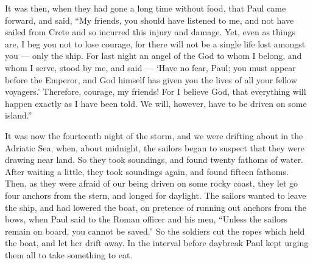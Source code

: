  It was then, when they had gone a long time without food,
that Paul came forward, and said, ``My friends, you should have listened
to me, and not have sailed from Crete and so incurred this injury and
damage.  Yet, even as things are, I beg you not to lose
courage, for there will not be a single life lost amongst you --- only
the ship.  For last night an angel of the God to whom I
belong, and whom I serve, stood by me, and said ---  `Have
no fear, Paul; you must appear before the Emperor, and God himself has
given you the lives of all your fellow voyagers.' 
Therefore, courage, my friends! For I believe God, that everything will
happen exactly as I have been told.  We will, however, have
to be driven on some island.''

 It was now the fourteenth night of the storm, and we were
drifting about in the Adriatic Sea, when, about midnight, the sailors
began to suspect that they were drawing near land.  So they
took soundings, and found twenty fathoms of water. After waiting a
little, they took soundings again, and found fifteen fathoms.
 Then, as they were afraid of our being driven on some
rocky coast, they let go four anchors from the stern, and longed for
daylight.  The sailors wanted to leave the ship, and had
lowered the boat, on pretence of running out anchors from the bows,
 when Paul said to the Roman officer and his men, ``Unless
the sailors remain on board, you cannot be saved.''  So the
soldiers cut the ropes which held the boat, and let her drift away.
 In the interval before daybreak Paul kept urging them all
to take something to eat.

